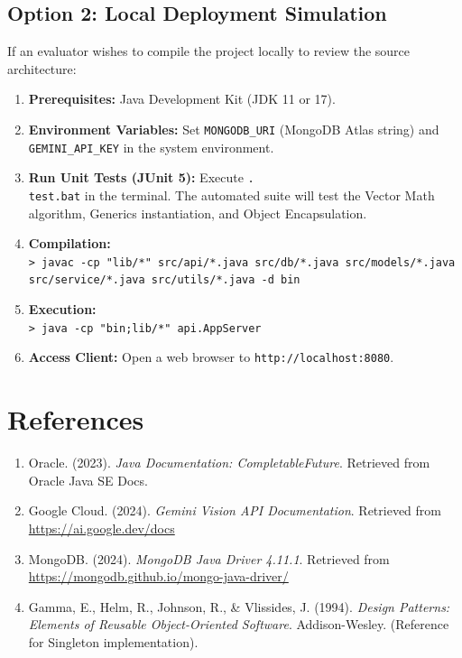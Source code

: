 \documentclass[12pt,a4paper]{article}
\begin{document}
\subsection{Option 2: Local Deployment Simulation}
If an evaluator wishes to compile the project locally to review the source architecture:
\begin{enumerate}
    \item \textbf{Prerequisites:} Java Development Kit (JDK 11 or 17).
    \item \textbf{Environment Variables:} Set \texttt{MONGODB\_URI} (MongoDB Atlas string) and \texttt{GEMINI\_API\_KEY} in the system environment.
    \item \textbf{Run Unit Tests (JUnit 5):} Execute \texttt{.\\test.bat} in the terminal. The automated suite will test the Vector Math algorithm, Generics instantiation, and Object Encapsulation.
    \item \textbf{Compilation:} \\
    \texttt{> javac -cp "lib/*" src/api/*.java src/db/*.java src/models/*.java src/service/*.java src/utils/*.java -d bin}
    \item \textbf{Execution:} \\
    \texttt{> java -cp "bin;lib/*" api.AppServer}
    \item \textbf{Access Client:} Open a web browser to \texttt{http://localhost:8080}.
\end{enumerate}

\section{References}
\begin{enumerate}
    \item Oracle. (2023). \textit{Java Documentation: CompletableFuture}. Retrieved from Oracle Java SE Docs.
    \item Google Cloud. (2024). \textit{Gemini Vision API Documentation}. Retrieved from \url{https://ai.google.dev/docs}
    \item MongoDB. (2024). \textit{MongoDB Java Driver 4.11.1}. Retrieved from \url{https://mongodb.github.io/mongo-java-driver/}
    \item Gamma, E., Helm, R., Johnson, R., \& Vlissides, J. (1994). \textit{Design Patterns: Elements of Reusable Object-Oriented Software}. Addison-Wesley. (Reference for Singleton implementation).
\end{enumerate}
\end{document}
